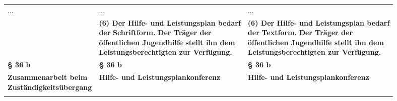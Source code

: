 \documentclass[10pt,a4paper,landscape]{article}
\begin{document}
\begin{longtable}{|L{8.2cm}|L{8.2cm}|L{8.2cm}|}
\hhline{|---|}
... & ... & ... \\
\hhline{|---|}
 & \textbf{(6) Der Hilfe- und Leistungsplan bedarf  \newline der }\textbf{\textcolor{diffred}{Schriftform.}}\textbf{ Der Träger der  \newline öffentlichen Jugendhilfe stellt ihn dem  \newline Leistungsberechtigten zur Verfügung. } & \textbf{(6) Der Hilfe- und Leistungsplan bedarf  \newline der }\textbf{\textcolor{diffgreen}{Textform.}}\textbf{ Der Träger der  \newline öffentlichen Jugendhilfe stellt ihn dem  \newline Leistungsberechtigten zur Verfügung. } \\
\hhline{|---|}
\textbf{\S{} 36 b} & \textbf{\S{} 36 b} & \textbf{\S{} 36 b} \\
\hhline{|---|}
\textbf{\textcolor{diffred}{Zusammenarbeit beim  \newline Zuständigkeitsübergang}} & \textbf{Hilfe- und Leistungsplankonferenz} & \textbf{Hilfe- und Leistungsplankonferenz} \\
\hhline{|---|}

\end{longtable}
\end{document}
